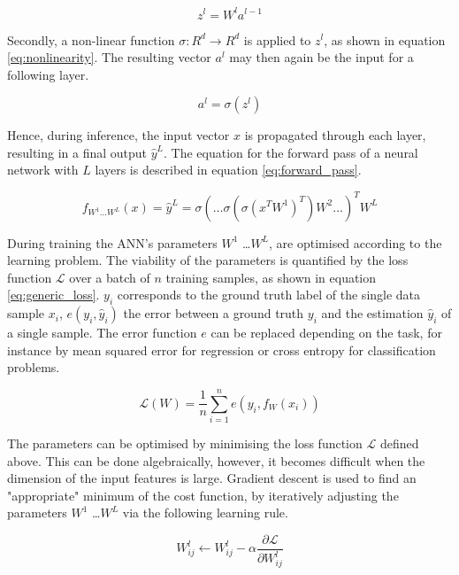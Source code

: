 $$ z^l = W^l a^{l-1} $$

Secondly, a non-linear function $\sigma: R^d \rightarrow R^d$ is applied to $z^{l}$, as shown in equation \ref{eq:nonlinearity}. The resulting vector $a^l$ may then again be the input for a following layer.

\begin{equation}
	a^l = \sigma(z^{l})	\label{eq:nonlinearity}
\end{equation}

Hence, during inference, the input vector $x$ is propagated through each layer, resulting in a final output $\hat{y}^L$. The equation for the forward pass of a neural network with $L$ layers is described in equation \ref{eq:forward_pass}. 

\begin{equation}
	f_{W^1 \dots W^L}(x) = \hat{y}^L = \sigma(… \sigma( \sigma( x^T W^1 )^T) W^2 …)^T W^L \label{eq:forward_pass}
\end{equation}

During training the ANN's parameters $W^1$ \dots $W^L$, are optimised according to the learning problem. The viability of the parameters is quantified by the loss function $\mathcal{L}$ over a batch of $n$ training samples, as shown in equation \ref{eq:generic_loss}. $y_i$ corresponds to the ground truth label of the single data sample $x_i$, $e(y_i, \hat{y}_i)$ the error between a ground truth $y_i$ and the estimation $\hat{y}_i$ of a single sample. The error function $e$ can be replaced depending on the task, for instance by mean squared error for regression or cross entropy for classification problems.

\begin{equation}
	\mathcal{L}(W) = \frac{1}{n}\sum_{i=1}^n e(y_i, f_{W}(x_i)) \label{eq:generic_loss}
\end{equation}

The parameters can be optimised by minimising the loss function $\mathcal{L}$ defined above. This can be done algebraically, however, it becomes difficult when the dimension of the input features is large. Gradient descent is used to find an "appropriate" minimum of the cost function, by iteratively adjusting the parameters $W^1$ \dots $W^L$ via the following learning rule.

\begin{equation}
	W^l_{ij} \leftarrow W^l_{ij} - \alpha \frac{\partial \mathcal{L}}{\partial W^l_{ij}}
\end{equation}

